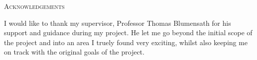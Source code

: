 \begin{center}
    \textsc{Acknowledgements}
\end{center}

I would like to thank my supervisor, Professor Thomas Blumensath for his support and guidance during my project. He let me go beyond the initial scope of the project and into an area I truely found very exciting, whilst also keeping me on track with the original goals of the project.
